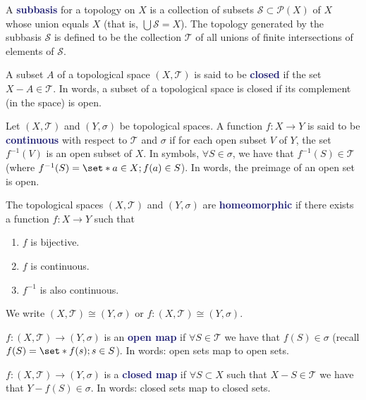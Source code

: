 \documentclass[11pt]{article}
\numberwithin{equation}{section}
\newcommand{\navy}[1]{\textcolor{MidnightBlue}{\bf #1}}
\theoremstyle{definition}
\theoremstyle{definition}
\newcommand\inv[1]{#1^{-1}}
\def\Set{\set*}%
\def\ss{\subset}
\newcommand{\1}{\mathbbm 1}
\newcommand{\pP}{\mathcal P}
\newcommand{\tT}{\mathcal T}
\newcommand{\sS}{\mathcal S}
\begin{document}
\begin{definition}[Subbasis]
A \navy{subbasis} for a topology on $X$ is a collection of subsets $\sS \ss \pP(X)$ of $X$ whose union equals $X$ (that is, $\bigcup \sS = X$). The topology generated by the subbasis $\sS$ is defined to be the collection $\tT$ of all unions of finite intersections of elements of $\sS$.
\end{definition}

\begin{definition}[Closed]
A subset $A$ of a topological space $(X,\tT)$ is said to be \navy{closed} if the set $X - A \in \tT$. In words, a subset of a topological space is closed if its complement (in the space) is open.
\end{definition}

\begin{definition}[Continuous]
Let $(X,\tT)$ and $(Y,\sigma)$ be topological spaces. A function $f : X \to Y$ is said to be \navy{continuous} with respect to $\tT$ and $\sigma$ if for each open subset $V$ of $Y$, the set $f^{-1}(V)$ is an open subset of $X$. In symbols, $\forall S \in \sigma$, we have that $\inv{f}(S) \in \tT$ (where $\inv{f}(S) = \Set{a \in X; f(a) \in S}$). In words, the preimage of an open set is open.
\end{definition}

\begin{definition}[Homeomorphic]
The topological spaces $(X,\tT)$ and $(Y,\sigma)$ are \navy{homeomorphic} if there exists a function $f: X \to Y$ such that
\begin{enumerate}
\item $f$ is bijective.
\item $f$ is continuous.
\item $\inv{f}$ is also continuous.
\end{enumerate}
We write $(X,\tT) \cong (Y,\sigma)$ or $f: (X,\tT) \cong (Y,\sigma)$.
\end{definition}

\begin{definition}
$f: (X,\tT) \to (Y,\sigma)$ is an \navy{open map} if $\forall S \in \tT$ we have that $f(S) \in \sigma$ (recall $f(S) = \Set{f(s);s \in S}$). In words: open sets map to open sets.
\end{definition}

\begin{definition}
$f: (X,\tT) \to (Y,\sigma)$ is a \navy{closed map} if $\forall S \ss X$ such that $X - S \in \tT$ we have that $Y - f(S) \in \sigma$. In words: closed sets map to closed sets.
\end{definition}
\end{document}
